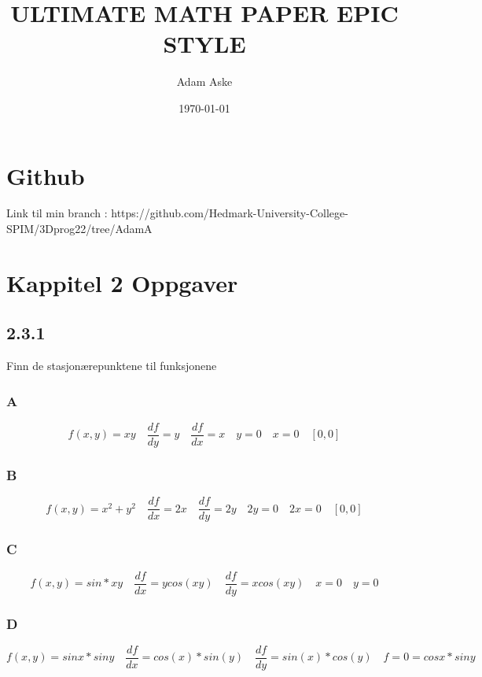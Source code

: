\documentclass[a4paper,norsk]{article}
\title{ULTIMATE MATH PAPER EPIC STYLE}
\date{\today}
\author{Adam Aske}
\begin{document}
\maketitle
\tableofcontents
{}
\newpage
 \section{Github}
Link til min branch : https://github.com/Hedmark-University-College-SPIM/3Dprog22/tree/AdamA

\section{Kappitel 2 Oppgaver}
\subsection{2.3.1}
Finn de stasjonærepunktene til funksjonene
\subsubsection{A}
\begin{equation*}f(x,y) = xy\quad \dfrac{df}{dy}=y \quad \dfrac{df}{dx}=x \quad y=0 \quad x=0 \quad [0,0]\end{equation*}
\subsubsection{B}
\begin{equation*} f(x,y) = x^{2} + y^{2} \quad \dfrac{df}{dx}=2x  \quad \dfrac{df}{dy}=2y \quad 2y=0 \quad 2x=0 \quad [0,0]\end{equation*}
\subsubsection{C}
\begin{equation*} f(x,y) = sin * xy \quad \dfrac{df}{dx}=y cos(xy) \quad \dfrac{df}{dy}=x cos(xy) \quad x = 0 \quad y = 0\end{equation*}
\subsubsection{D}
\begin{equation*} f(x,y) = sin x * sin y\quad \dfrac{df}{dx}=cos(x) * sin(y) \quad \dfrac{df}{dy}=sin(x) * cos(y) \quad 
f= 0 = cos x * sin y\end{equation*}
\end{document}
